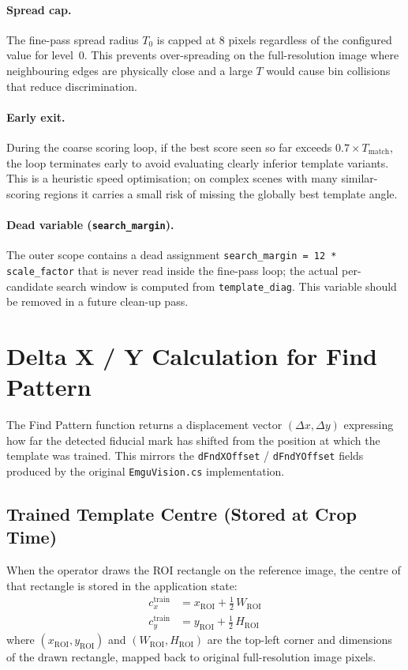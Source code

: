 \documentclass[12pt,a4paper]{article}
\begin{document}
\paragraph{Spread cap.}  The fine-pass spread radius $T_0$ is capped at 8 pixels
regardless of the configured value for level~0.  This prevents over-spreading on
the full-resolution image where neighbouring edges are physically close and a large
$T$ would cause bin collisions that reduce discrimination.

\paragraph{Early exit.}  During the coarse scoring loop, if the best score seen so
far exceeds $0.7 \times T_\text{match}$, the loop terminates early to avoid
evaluating clearly inferior template variants.  This is a heuristic speed
optimisation; on complex scenes with many similar-scoring regions it carries a
small risk of missing the globally best template angle.

\paragraph{Dead variable (\texttt{search\_margin}).}  The outer scope contains a
dead assignment \texttt{search\_margin = 12 * scale\_factor} that is never read
inside the fine-pass loop; the actual per-candidate search window is computed
from \texttt{template\_diag}.  This variable should be removed in a future
clean-up pass.

\section{Delta X / Y Calculation for Find Pattern}

The Find Pattern function returns a displacement vector
$(\Delta x, \Delta y)$ expressing how far the detected fiducial mark has shifted
from the position at which the template was trained.  This mirrors the
\texttt{dFndXOffset} / \texttt{dFndYOffset} fields produced by the original
\texttt{EmguVision.cs} implementation.

\subsection{Trained Template Centre (Stored at Crop Time)}
When the operator draws the ROI rectangle on the reference image, the centre of
that rectangle is stored in the application state:
\begin{align}
  c_x^\text{train} &= x_\text{ROI} + \tfrac{1}{2}\,W_\text{ROI} \\
  c_y^\text{train} &= y_\text{ROI} + \tfrac{1}{2}\,H_\text{ROI}
\end{align}
where $(x_\text{ROI}, y_\text{ROI})$ and $(W_\text{ROI}, H_\text{ROI})$ are the
top-left corner and dimensions of the drawn rectangle, mapped back to original
full-resolution image pixels.
\end{document}
